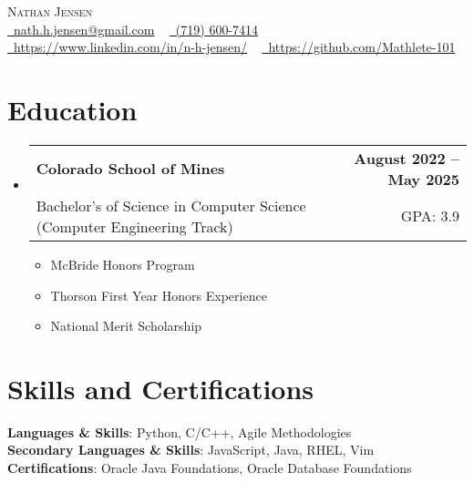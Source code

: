 \documentclass[11pt, letterpaper]{article}
\makeatletter
\newcommand{\resumeItem}[1]{
  \item\small{
    {#1 \vspace{-2pt}}
  }
}
\newcommand{\resumeSubheading}[4]{
  \vspace{-2pt}\item
    \begin{tabular*}{1.0\textwidth}[t]{l@{\extracolsep{\fill}}r}
      \textbf{#1} & \textbf{\small #2} \\
      {\small#3} & {\small #4} \\
    \end{tabular*}\vspace{-7pt}
}
\newcommand{\resumeSubHeadingListStart}{\begin{itemize}[leftmargin=0.0in, label={}]}
\newcommand{\resumeSubHeadingListEnd}{\end{itemize}}
\newcommand{\resumeItemListStart}{\begin{itemize}}
\newcommand{\resumeItemListEnd}{\end{itemize}\vspace{-5pt}}
\makeatother
\begin{document}
\begin{center}
    {
    \huge \scshape Nathan Jensen} \\ \vspace{4pt}
    \small
    \href{mailto:nath.h.jensen@gmail.com}{\faEnvelope\ nath.h.jensen@gmail.com} ~
    \href{tel:7196007414}{\faPhone\ (719) 600-7414} ~ \\
    \vspace{2pt}
    \href{https://www.linkedin.com/in/n-h-jensen/}{\faLinkedin\ https://www.linkedin.com/in/n-h-jensen/}  ~
    \href{https://github.com/Mathlete-101}{\faGithub\ https://github.com/Mathlete-101}
    \vspace{-5pt}
\end{center}



\section{Education}   %
  \resumeSubHeadingListStart
    \resumeSubheading
      {Colorado School of Mines}{August 2022 -- May 2025}
      {Bachelor's of Science in Computer Science (Computer Engineering Track)}{GPA: 3.9}
      \resumeItemListStart
        \resumeItem{McBride Honors Program}
        \resumeItem{Thorson First Year Honors Experience}
        \resumeItem{National Merit Scholarship}
    \resumeItemListEnd
    \resumeSubHeadingListEnd

\section{Skills and Certifications}   %
 \begin{itemize}[leftmargin=0.1in, label={}]
    \small{\item{
      \textbf{Languages \& Skills}{: Python, C/C++, Agile Methodologies} \\
      \textbf{Secondary Languages \& Skills}{: JavaScript, Java, RHEL, Vim}\\
      \textbf{Certifications}{: Oracle Java Foundations, Oracle Database Foundations}\\
    }}
 \end{itemize}
\end{document}
